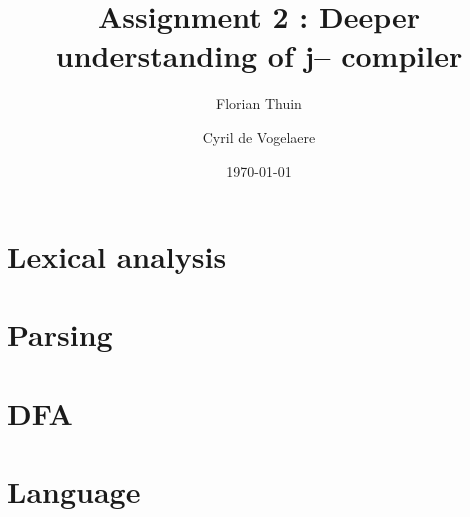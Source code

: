 \documentclass[a4paper, 11pt]{article}
\author{Florian Thuin \and Cyril de Vogelaere}
\date{\today}
\title{Assignment 2 : Deeper understanding of j-- compiler}
\begin{document}
    \maketitle
    \tableofcontents
    \section{Lexical analysis}
    \section{Parsing}
    \section{DFA}
    \section{Language}
\end{document}
